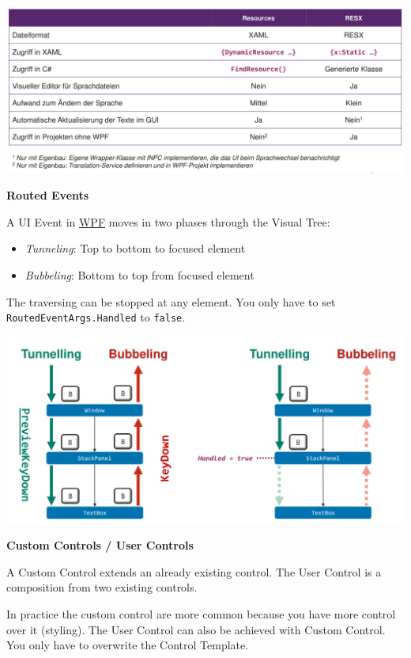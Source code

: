 \documentclass[10pt,twoside,landscape]{article}
\begin{document}
\begin{multicols}{4}
\begin{center}
\includegraphics[width=.9\linewidth]{img/localization_wpf.png}
\end{center}

\textbf{Routed Events}

A UI Event in \href{../../../roam/20211123162923-wpf.org}{WPF} moves in two phases through the Visual Tree:
\begin{itemize}
\item \emph{Tunneling}: Top to bottom to focused element
\item \emph{Bubbeling}: Bottom to top from focused element
\end{itemize}


The traversing can be stopped at any element.
You only have to set \texttt{RoutedEventArgs.Handled} to \texttt{false}.


\begin{center}
\includegraphics[width=.9\linewidth]{img/routed_events.png}
\end{center}


\textbf{Custom Controls / User Controls}

A Custom Control extends an already existing control.
The User Control is a composition from two existing controls.

In practice the custom control are more common because you have more control over it (styling).
The User Control can also be achieved with Custom Control.
You only have to overwrite the Control Template.



\end{multicols}
\end{document}
